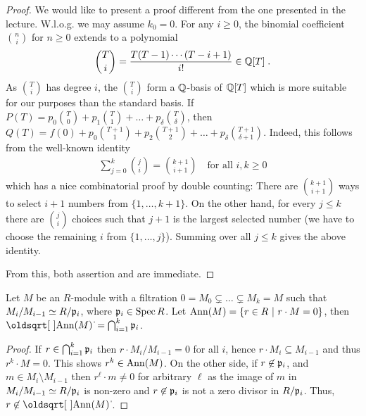 \documentclass[a4paper,parskip=half,numbers=enddot, DIV=12]{scrreprt}
\begin{document}
\begin{proof}
	We would like to present a proof different from the one presented in the lecture. W.l.o.g. we may assume $k_0=0$. For any $i\geq0$, the binomial coefficient $\binom{n}{i}$ for $n\geq0$ extends to a polynomial 
	\begin{align*}
		\binom{T}{i}=\frac{T(T-1)\cdots(T-i+1)}{i!}\in\mathbb{Q}[T]\;.
	\end{align*}
	As $\binom{T}{i}$ has degree $i$, the $\binom{T}{i}$ form a $\mathbb{Q}$-basis of $\mathbb{Q}[T]$ which is more suitable for our purposes than the standard basis. If $P(T)=p_0\binom{T}{0}+p_1\binom{T}{1}+\ldots+p_\delta \binom{T}{\delta}$, then $Q(T)=f(0)+p_0\binom{T+1}{1}+p_2\binom{T+1}{2}+\ldots+p_\delta\binom{T+1}{\delta+1}$. Indeed, this follows from the well-known identity
	\begin{align*}
		\sum_{j=0}^{k}\binom{j}{i}=\binom{k+1}{i+1}\quad\text{for all }i,k\geq 0
	\end{align*}
	which has a nice combinatorial proof by double counting: There are $\binom{k+1}{i+1}$ ways to select $i+1$ numbers from $\{1,\ldots,k+1\}$. On the other hand, for every $j\leq k$ there are $\binom{j}{i}$ choices such that $j+1$ is the largest selected number (we have to choose the remaining $i$ from $\{1,\ldots,j\}$). Summing over all $j\leq k$ gives the above identity.
	
	From this, both assertion  and  are immediate.
\end{proof}
\begin{fact}
    Let $M$ be an $R$-module with a filtration $0=M_0\subsetneq \ldots \subsetneq M_k=M$ such that $M_i/M_{i-1}\simeq R/\mathfrak{p}_i$, where $\mathfrak{p}_i \in \operatorname{Spec} R$. Let $\operatorname{Ann}(M) = \left\{r\in R\ \middle|\  r\cdot M = 0\right\}$, then $\sqrt{\Ann(M)} = \bigcap_{i=1}^k\pp_i$.
\end{fact}
\begin{proof}
    If $r\in \bigcap_{i=1}^k\mathfrak{p}_i$ then $r\cdot M_i/M_{i-1} = 0$ for all $i$, hence $r\cdot M_i\subseteq M_{i-1}$ and thus $r^k\cdot M =0$. This shows $r^k\in \operatorname{Ann}(M)$. On the other side, if $r\not\in \mathfrak{p}_i$, and $m\in M_i\setminus M_{i-1}$ then $r^\ell\cdot m \neq 0$ for arbitrary $\ell$ as the image of $m$ in $M_i/M_{i-1} \simeq R/\mathfrak{p}_i$ is non-zero and $r\not\in \mathfrak{p}_i$ is not a zero divisor in $R/\mathfrak{p}_i$. Thus, $r\not\in \sqrt{\Ann(M)}$.
\end{proof}
\end{document}
